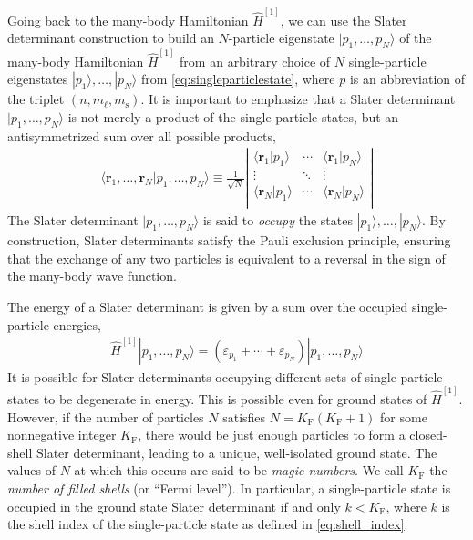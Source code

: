 Going back to the many-body Hamiltonian $\hat{H}^{[1]}$, we can use the Slater determinant construction to build an $N$-particle eigenstate $|p_1, \ldots, p_N\rangle$ of the many-body Hamiltonian $\hat{H}^{[1]}$ from an arbitrary choice of $N$ single-particle eigenstates $|p_1\rangle, \ldots, |p_N\rangle$ from \eqref{eq:singleparticlestate}, where $p$ is an abbreviation of the triplet $(n, m_\ell, m_{\mathrm{s}})$.  It is important to emphasize that a Slater determinant $|p_1, \ldots, p_N\rangle$ is not merely a product of the single-particle states, but an antisymmetrized sum over all possible products,
\begin{align*}
  \langle \bm{r}_1, \ldots, \bm{r}_N | p_1, \ldots, p_N \rangle \equiv
  \frac{1}{\sqrt{N}} \left|
  \begin{matrix}
    \langle \bm{r}_1 | p_1 \rangle & \cdots & \langle \bm{r}_1 | p_N \rangle \\
    \vdots & \ddots & \vdots \\
    \langle \bm{r}_N | p_1 \rangle & \cdots & \langle \bm{r}_N | p_N \rangle \\
  \end{matrix}
  \right|
\end{align*}
The Slater determinant $|p_1, \ldots, p_N\rangle$ is said to \textit{occupy} the states $|p_1\rangle, \ldots, |p_N\rangle$.  By construction, Slater determinants satisfy the Pauli exclusion principle, ensuring that the exchange of any two particles is equivalent to a reversal in the sign of the many-body wave function.

The energy of a Slater determinant is given by a sum over the occupied single-particle energies,
\begin{align*}
  \hat{H}^{[1]} | p_1, \ldots, p_N \rangle = (\varepsilon_{p_1} + \cdots + \varepsilon_{p_N}) | p_1, \ldots, p_N \rangle
\end{align*}
It is possible for Slater determinants occupying different sets of single-particle states to be degenerate in energy.  This is possible even for ground states of $\hat{H}^{[1]}$.  However, if the number of particles $N$ satisfies $N = K_{\mathrm{F}} (K_{\mathrm{F}} + 1)$ for some nonnegative integer $K_{\mathrm{F}}$, there would be just enough particles to form a closed-shell Slater determinant, leading to a unique, well-isolated ground state.  The values of $N$ at which this occurs are said to be \textit{magic numbers}.  We call $K_{\mathrm{F}}$ the \textit{number of filled shells} (or ``Fermi level'').  In particular, a single-particle state is occupied in the ground state Slater determinant if and only $k < K_{\mathrm{F}}$, where $k$ is the shell index of the single-particle state as defined in \eqref{eq:shell_index}.

